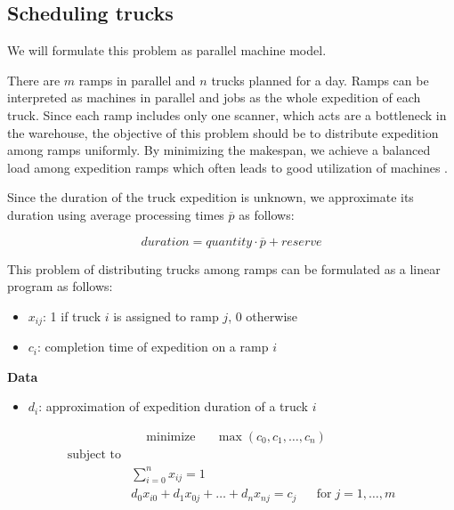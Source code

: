\documentclass{ctuthesis}
\begin{document}
 \subsection{Scheduling trucks}
 
 We will formulate this problem as parallel machine model.
 
 There are $m$ ramps in parallel and $n$ trucks planned for a day. Ramps can be interpreted as machines in parallel and jobs as the whole expedition of each truck. Since each ramp includes only one scanner, which acts are a bottleneck in the warehouse, the objective of this problem should be to distribute expedition among ramps uniformly. By minimizing the makespan, we achieve a balanced load among expedition ramps which often leads to good utilization of machines \cite{pinedo}. 
 
 Since the duration of the truck expedition is unknown, we approximate its duration using average processing times $\overline{p}$ as follows:
 
 \begin{equation}
     duration = quantity \cdot \overline{p} + reserve
 \end{equation}
 
 This problem of distributing trucks among ramps can be formulated as a linear program as follows:
 
\begin{itemize}
\item $x_{ij}$: 1 if truck $i$ is assigned to ramp $j$, 0 otherwise
\item$c_i$: completion time of expedition on a ramp $i$
\end{itemize}
\textbf{Data}
\begin{itemize}
\item$d_i$: approximation of expedition duration of a truck $i$
\end{itemize}

\begin{equation}
\begin{aligned}
&\text{minimize}
&&\max(c_0, c_1, \ldots, c_n)
\end{aligned}
\end{equation}
\begin{equation}
\begin{aligned}
\text{subject to}\\
& \sum_{i=0}^{n} x_{ij} = 1 &&\\
& d_0x_{i0} + d_1x_{0j} + \ldots + d_nx_{nj} = c_j && \text{for}\; j = 1, \ldots, m\\
\end{aligned}
\end{equation}
 
\end{document}
